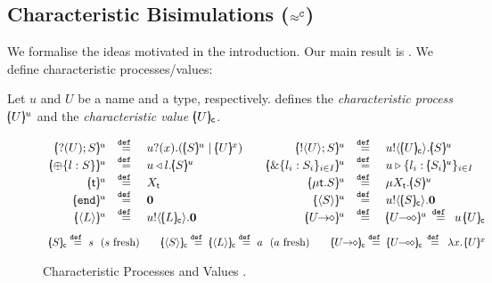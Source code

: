 \subsection{%
Characteristic  Bisimulations ($\approx^\mathtt{C}$)}\label{ss:hwb}
\noi 
We formalise the ideas motivated in %
the introduction.
Our main result is .
We define characteristic processes/values:

\begin{definition}\rm
\label{def:char}
	Let $u$ and $U$ be a name and a type, respectively.
	 defines the {\em characteristic process} 
	$[\!\!(U)\!\!]^{u}$ and the {\em characteristic value} $[\!\!(U)\!\!]_{\mathsf{c}}$.
\end{definition}

\begin{figure}[t]
\[
	\begin{array}{rclcrcl}
		\mapchar{\btinp{U} S}{u}
		&\defeq&
		\binp{u}{x} (\mapchar{S}{u} \Par \mapchar{U}{x})
		&&
		\mapchar{\btout{U} S}{u}
		&\defeq&
		\bout{u}{\omapchar{U}} \mapchar{S}{u} %
		\\

		\mapchar{\btsel{l : S}}{u}
		& \defeq &
		\bsel{u}{l} \mapchar{S}{u}
		&&
		\mapchar{\btbra{l_i: S_i}_{i \in I}}{u}
		& \defeq &
		\bbra{u}{l_i: \mapchar{S_i}{u}}_{i \in I}
		\\

		\mapchar{\tvar{t}}{u}
		&\defeq&
		\varp{X}_{\vart{t}}
		& & 
		\mapchar{\trec{t}{S}}{u}
		&\defeq&
		\recp{X_{\vart{t}}}{\mapchar{S}{u}}
		\\

		\mapchar{\tinact}{u}
		& \defeq &
		\inact
		& & 
		\mapchar{\chtype{S}}{u} 
		&\defeq&
		\bout{u}{\omapchar{S}} \inact
		\\

		\mapchar{\chtype{L}}{u}
		&\defeq&
		\bout{u}{\omapchar{L}} \inact
		&&
		\mapchar{\shot{U}}{u}
		&\defeq &
		\mapchar{\lhot{U}}{u}
		\, \defeq \,
		\appl{u}{\omapchar{U}}
		\end{array}
		\]
		\vspace{-3mm}
		\[
		\begin{array}{c}
		\omapchar{S}  \defeq  s ~~ (s \textrm{ fresh})
		\qquad
		\omapchar{\chtype{S}} \defeq \omapchar{\chtype{L}} \defeq a ~~ (a \textrm{ fresh})
		\qquad
		\omapchar{\shot{U}} \defeq \omapchar{\lhot{U}} \,\defeq\, \abs{x}{\mapchar{U}{x}}
	\end{array}
\]
\vspace{-5mm}
\caption{Characteristic Processes  and Values .\label{fig:char}}
\vspace{-5mm}
\end{figure}

